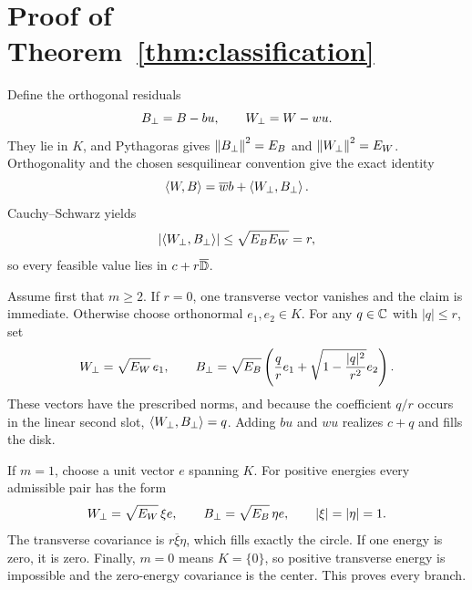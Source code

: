 \section{Proof of Theorem~\ref{thm:classification}}

Define the orthogonal residuals
\[
 B_{\perp}=B-bu,
 \qquad
 W_{\perp}=W-wu.
\]
They lie in $K$, and Pythagoras gives
$\left\lVert B_{\perp}\right\rVert^2=E_B$ and $\left\lVert W_{\perp}\right\rVert^2=E_W$.  Orthogonality and the
chosen sesquilinear convention give the exact identity
\begin{equation}\label{eq:split}
 \left\langle W,B\right\rangle=\overline w b+\left\langle W_{\perp},B_{\perp}\right\rangle.
\end{equation}
Cauchy--Schwarz yields
\begin{equation}\label{eq:cauchy}
 \left\lvert \left\langle W_{\perp},B_{\perp}\right\rangle\right\rvert\le \sqrt{E_BE_W}=r,
\end{equation}
so every feasible value lies in $c+r\overline{\mathbb{D}}$.

Assume first that $m\ge2$.  If $r=0$, one transverse vector vanishes and the
claim is immediate.  Otherwise choose orthonormal $e_1,e_2\in K$.  For any
$q\in\mathbb{C}$ with $|q|\le r$, set
\[
 W_{\perp}=\sqrt{E_W}\,e_1,
 \qquad
 B_{\perp}=\sqrt{E_B}\left(
       \frac{q}{r}e_1+
       \sqrt{1-\frac{|q|^2}{r^2}}e_2\right).
\]
These vectors have the prescribed norms, and because the coefficient $q/r$
occurs in the linear second slot,
$\left\langle W_{\perp},B_{\perp}\right\rangle=q$.  Adding $bu$ and $wu$ realizes $c+q$ and fills the
disk.

If $m=1$, choose a unit vector $e$ spanning $K$.  For positive energies every
admissible pair has the form
\[
 W_{\perp}=\sqrt{E_W}\,\xi e,
 \qquad
 B_{\perp}=\sqrt{E_B}\,\eta e,
 \qquad |\xi|=|\eta|=1.
\]
The transverse covariance is $r\overline\xi\eta$, which fills exactly the
circle.  If one energy is zero, it is zero.  Finally, $m=0$ means $K=\{0\}$,
so positive transverse energy is impossible and the zero-energy covariance is
the center.  This proves every branch.
